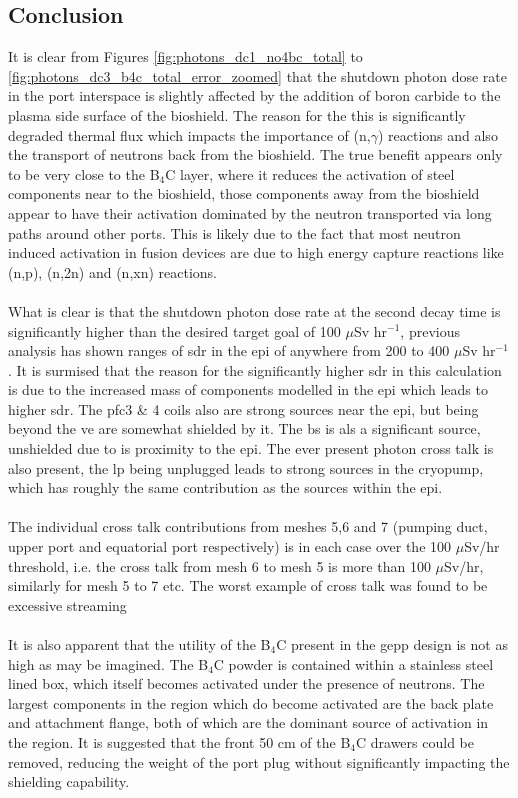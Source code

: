 \documentclass[12pt]{article}
\begin{document}
\subsection{Conclusion}
It is clear from Figures \ref{fig:photons_dc1_no4bc_total} to 
\ref{fig:photons_dc3_b4c_total_error_zoomed} that the shutdown photon dose rate 
in the port interspace is slightly affected by the addition of boron carbide 
to the plasma side surface of the bioshield. The reason for the this is 
significantly degraded thermal flux which impacts the importance of (n,$\gamma$)
 reactions and also the transport of neutrons back from the bioshield. The true 
benefit appears only to be very close to the B$_4$C layer, where it reduces the
activation of steel components near to the bioshield, those components away
from the bioshield appear to have their activation dominated by the neutron
transported via long paths around other ports. This is  likely due to the fact
that most neutron induced activation in fusion devices are due to high energy
capture reactions like (n,p), (n,2n) and (n,xn) reactions.
\\
\\
What is clear is that the shutdown photon dose rate at the second decay time is
significantly higher than the desired target goal of 100 $\mu$Sv hr$^{-1}$,
previous analysis has shown ranges of \gls{sdr} in the \gls{epi} of anywhere
from 200 to 400 $\mu$Sv hr$^{-1}$. It is surmised that the reason for the
significantly higher \gls{sdr} in this calculation is due to the increased
mass of components modelled in the \gls{epi} which leads to higher \gls{sdr}.
The \gls{pfc}3 \& 4 coils also are strong sources near the \gls{epi}, but being
beyond the \gls{ve} are somewhat shielded by it. The \gls{bs} is als a
significant source, unshielded due to is proximity to the \gls{epi}. The ever
present photon cross talk is also present, the \gls{lp} being unplugged leads
to strong sources in the cryopump, which has roughly the same contribution
as the sources within the \gls{epi}.
\\
\\
The individual cross talk contributions from meshes 5,6 and 7 (pumping duct, 
upper port and equatorial port respectively) is in each case over the 100 
$\mu$Sv/hr threshold, i.e. the cross talk from mesh 6 to mesh 5 is more than 100 
$\mu$Sv/hr, similarly for mesh 5 to 7 etc. The worst example of cross talk was 
found to be excessive streaming 
\\
\\
It is also apparent that the utility of the B$_4$C present in the \gls{gepp}
design is not as high as may be imagined. The B$_4$C powder is contained within
a stainless steel lined box, which itself becomes activated under the presence
of neutrons. The largest components in the region which do become activated are
the back plate and attachment flange, both of which are the dominant source of
activation in the region. It is suggested that the front 50 cm of the B$_4$C
drawers could be removed, reducing the weight of the port plug without
significantly impacting the shielding capability.
\end{document}
